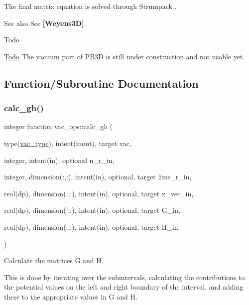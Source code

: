 The final matrix equation is solved through Strumpack \cite{Meiser2016}.

\begin{DoxySeeAlso}{See also}
See {\bfseries [Weyens3D]}.
\end{DoxySeeAlso}
\begin{DoxyRefDesc}{Todo}
\item[\hyperlink{todo__todo000001}{Todo}]The vacuum part of P\+B3D is still under construction and not usable yet. \end{DoxyRefDesc}


\subsection{Function/\+Subroutine Documentation}
\mbox{\label{namespacevac__ops_a7e3f92fbe9fa6cf3de6ac301676b96d1}} 
\subsubsection{\texorpdfstring{calc\+\_\+gh()}{calc\_gh()}}
{\footnotesize\ttfamily integer function vac\+\_\+ops\+::calc\+\_\+gh (\begin{DoxyParamCaption}\item[{type(\hyperlink{structvac__vars_1_1vac__type}{vac\+\_\+type}), intent(inout), target}]{vac,  }\item[{integer, intent(in), optional}]{n\+\_\+r\+\_\+in,  }\item[{integer, dimension(\+:,\+:), intent(in), optional, target}]{lims\+\_\+r\+\_\+in,  }\item[{real(dp), dimension(\+:,\+:), intent(in), optional, target}]{x\+\_\+vec\+\_\+in,  }\item[{real(dp), dimension(\+:,\+:), intent(in), optional, target}]{G\+\_\+in,  }\item[{real(dp), dimension(\+:,\+:), intent(in), optional, target}]{H\+\_\+in }\end{DoxyParamCaption})}



Calculate the matrices {\ttfamily G} and {\ttfamily H}. 

This is done by iterating over the subintervals, calculating the contributions to the potential values on the left and right boundary of the interval, and adding these to the appropriate values in G and H.

